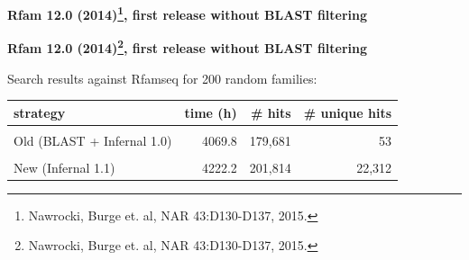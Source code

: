 \documentclass[landscape]{slides}
\begin{document}
\begin{slide}
\begin{center}

\textbf{Rfam 12.0 (2014)\footnote{Nawrocki, Burge et. al, NAR 43:D130-D137, 2015.}, 
first release without BLAST filtering}
\end{center}



\vfill
\end{slide}
\begin{slide}
\begin{center}

\textbf{Rfam 12.0 (2014)\footnote{Nawrocki, Burge et. al, NAR 43:D130-D137, 2015.}, 
first release without BLAST filtering}

\end{center}

\begin{center}
Search results against Rfamseq for 200 random families:

\medskip

\begin{tabular}{l|r|r|r}
strategy                   & time (h) & \# hits & \# unique hits \\ \hline
& & & \\
Old (BLAST + Infernal 1.0) & 4069.8   &  179,681 & 53 \\
& & & \\
New (Infernal 1.1)         & 4222.2   &  201,814 & 22,312 \\
\end{tabular}
\end{center}

\vfill
\end{slide}
\end{document}
